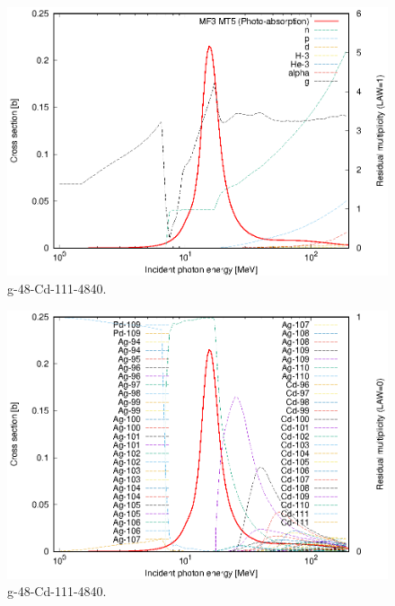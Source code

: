 \begin{figure}
 \includegraphics[width=\linewidth]{eps/g_48-Cd-111_4840.eps}
  \caption{g-48-Cd-111-4840.}
\end{figure}
\begin{figure}
 \includegraphics[width=\linewidth]{eps-law0/g_48-Cd-111_4840.eps}
 \caption{g-48-Cd-111-4840.}
\end{figure}
\newpage \clearpage


